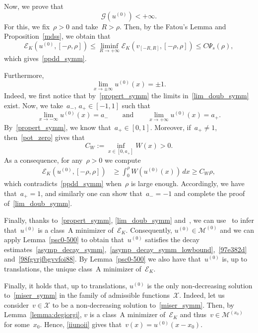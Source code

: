 \documentclass[10pt,a4paper]{amsart}
\numberwithin{equation}{section}
\newcommand{\Ec}{\mathcal{E}_K}
\begin{document}
Now, we prove that
\begin{equation}\label{ppdd_symm}
\mathscr{G}(u^{(0)}) <+\infty.
\end{equation}
For this, we fix~$\rho>0$ and take~$R>\rho$. Then, by the Fatou\rq{}s Lemma and Proposition~\ref{mdss}, we obtain that
\begin{equation*}
\Ec(u^{(0)}, [-\rho,\rho]) \leq \liminf_{R \to +\infty} \Ec(v_{[-R,R]}, [-\rho,\rho]) \leq C\Psi_s(\rho),
\end{equation*}
which gives~\ref{ppdd_symm}. 

Furthermore,
\begin{equation}\label{lim_doub_symm}
\lim_{x \to \pm \infty} u^{(0)}(x)= \pm1.
\end{equation}
Indeed, we first notice that by~\eqref{propert_symm} the limits in~\eqref{lim_doub_symm} exist. Now, we take~$a_{-}$, $a_{+} \in [-1,1]$ such that 
\begin{equation*}
\lim_{x \to -\infty}u^{(0)}(x) = a_{-} \qquad\mbox{and}\qquad \lim_{x \to +\infty}u^{(0)}(x) = a_{+}.
\end{equation*}
By~\eqref{propert_symm}, we know that~$a_{+} \in [0,1]$. Moreover, if~$a_{+}\neq 1$, then~\eqref{pot_zero} gives that
\begin{equation*}
C_W :=\inf_{x \in [0,a_{+}]}W(x)>0.
\end{equation*}
As a consequence, for any~$\rho>0$ we compute
\begin{equation*}
\begin{split}
\Ec (u^{(0)}, [-\rho,\rho]) &\geq \int_{0}^{\rho}W(u^{(0)}(x)) \, dx \geq C_W \rho,
\end{split}
\end{equation*}
which contradicts~\eqref{ppdd_symm} when~$\rho$ is large enough.
Accordingly, we have that~$a_{+}=1$, and similarly one can show that~$a_{-}=-1$ and complete the proof of~\eqref{lim_doub_symm}.

Finally, thanks to~\eqref{propert_symm}, \eqref{lim_doub_symm} and~\cite[Remark 2.7]{CP16}, we can use~\cite[Theorem 3]{CP16} to infer that~$u^{(0)}$ is a class~A minimizer of~$\Ec$. Consequently, $u^{(0)} \in \mathscr{M}^{(0)}$ and we can apply Lemma~\ref{psc0-500} to obtain that~$u^{(0)}$ satisfies the decay estimates~\eqref{asymp_decay_symm},~\eqref{asymp_decay_symm_lowbound},~\eqref{97e382d} and~\eqref{98fgvrjfbgvvfoi88}. By Lemma~\ref{psc0-500} we also have that~$u^{(0)}$ is, up to translations, the unique class~A minimizer of~$\Ec$.

Finally, it holds that, up to translations, $u^{(0)}$ is the only non-decreasing solution to~\eqref{miser_symm} in the family of admissible functions~$\mathcal{X}$. Indeed, let us consider~$v \in \mathcal{X}$ to be a non-decreasing solution to~\eqref{miser_symm}.  Then, by Lemma~\ref{lemma:degiorgi}, $v$ is a class~A minimizer of~$\Ec$ and thus~$v \in \mathscr{M}^{(x_0)}$ for some~$x_0$. Hence, \eqref{iiunoii} gives that~$v(x)= u^{(0)}(x-x_0)$.
\end{document}
